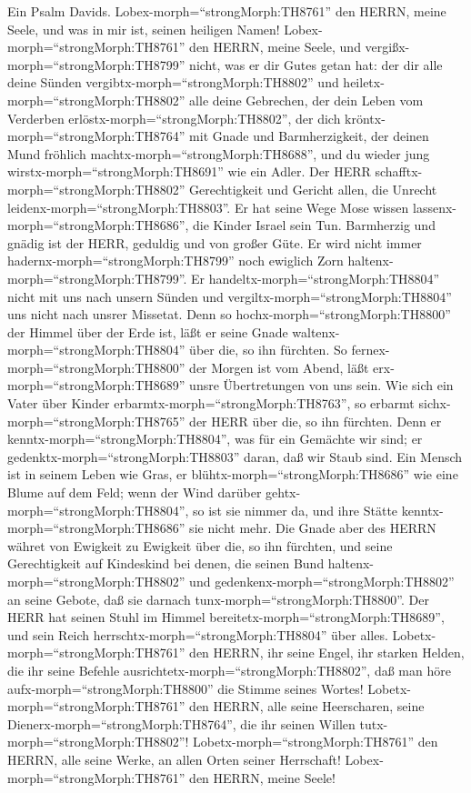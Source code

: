  Ein Psalm Davids. Lobex-morph=``strongMorph:TH8761'' den
HERRN, meine Seele, und was in mir ist, seinen heiligen Namen!
 Lobex-morph=``strongMorph:TH8761'' den HERRN, meine Seele,
und vergißx-morph=``strongMorph:TH8799'' nicht, was er dir Gutes getan
hat:  der dir alle deine Sünden
vergibtx-morph=``strongMorph:TH8802'' und
heiletx-morph=``strongMorph:TH8802'' alle deine Gebrechen, 
der dein Leben vom Verderben erlöstx-morph=``strongMorph:TH8802'', der
dich kröntx-morph=``strongMorph:TH8764'' mit Gnade und Barmherzigkeit,
 der deinen Mund fröhlich
machtx-morph=``strongMorph:TH8688'', und du wieder jung
wirstx-morph=``strongMorph:TH8691'' wie ein Adler.  Der HERR
schafftx-morph=``strongMorph:TH8802'' Gerechtigkeit und Gericht allen,
die Unrecht leidenx-morph=``strongMorph:TH8803''.  Er hat
seine Wege Mose wissen lassenx-morph=``strongMorph:TH8686'', die Kinder
Israel sein Tun.  Barmherzig und gnädig ist der HERR,
geduldig und von großer Güte.  Er wird nicht immer
hadernx-morph=``strongMorph:TH8799'' noch ewiglich Zorn
haltenx-morph=``strongMorph:TH8799''.  Er
handeltx-morph=``strongMorph:TH8804'' nicht mit uns nach unsern Sünden
und vergiltx-morph=``strongMorph:TH8804'' uns nicht nach unsrer
Missetat.  Denn so hochx-morph=``strongMorph:TH8800'' der
Himmel über der Erde ist, läßt er seine Gnade
waltenx-morph=``strongMorph:TH8804'' über die, so ihn fürchten.
 So fernex-morph=``strongMorph:TH8800'' der Morgen ist vom
Abend, läßt erx-morph=``strongMorph:TH8689'' unsre Übertretungen von uns
sein.  Wie sich ein Vater über Kinder
erbarmtx-morph=``strongMorph:TH8763'', so erbarmt
sichx-morph=``strongMorph:TH8765'' der HERR über die, so ihn fürchten.
 Denn er kenntx-morph=``strongMorph:TH8804'', was für ein
Gemächte wir sind; er gedenktx-morph=``strongMorph:TH8803'' daran, daß
wir Staub sind.  Ein Mensch ist in seinem Leben wie Gras,
er blühtx-morph=``strongMorph:TH8686'' wie eine Blume auf dem Feld;
 wenn der Wind darüber gehtx-morph=``strongMorph:TH8804'',
so ist sie nimmer da, und ihre Stätte
kenntx-morph=``strongMorph:TH8686'' sie nicht mehr.  Die
Gnade aber des HERRN währet von Ewigkeit zu Ewigkeit über die, so ihn
fürchten, und seine Gerechtigkeit auf Kindeskind  bei
denen, die seinen Bund haltenx-morph=``strongMorph:TH8802'' und
gedenkenx-morph=``strongMorph:TH8802'' an seine Gebote, daß sie darnach
tunx-morph=``strongMorph:TH8800''.  Der HERR hat seinen
Stuhl im Himmel bereitetx-morph=``strongMorph:TH8689'', und sein Reich
herrschtx-morph=``strongMorph:TH8804'' über alles. 
Lobetx-morph=``strongMorph:TH8761'' den HERRN, ihr seine Engel, ihr
starken Helden, die ihr seine Befehle
ausrichtetx-morph=``strongMorph:TH8802'', daß man höre
aufx-morph=``strongMorph:TH8800'' die Stimme seines Wortes!
 Lobetx-morph=``strongMorph:TH8761'' den HERRN, alle seine
Heerscharen, seine Dienerx-morph=``strongMorph:TH8764'', die ihr seinen
Willen tutx-morph=``strongMorph:TH8802''! 
Lobetx-morph=``strongMorph:TH8761'' den HERRN, alle seine Werke, an
allen Orten seiner Herrschaft! Lobex-morph=``strongMorph:TH8761'' den
HERRN, meine Seele!

